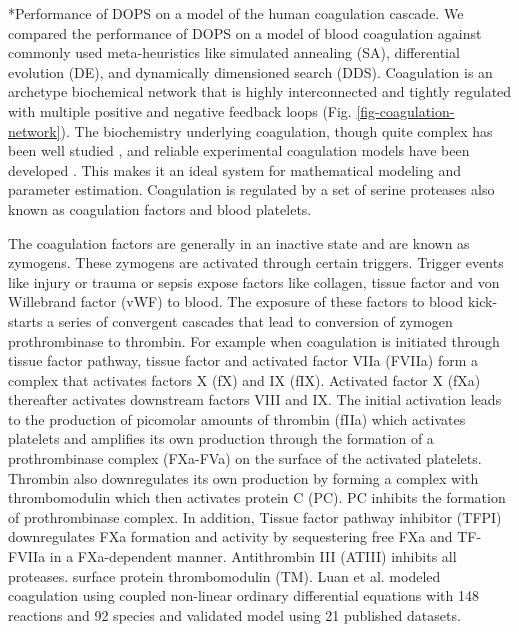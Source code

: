 \documentclass[12pt]{article}
\makeatletter
\renewcommand\subsection{\@startsection
	{subsection}{2}{0mm}
	{-0.05in}
	{-0.5\baselineskip}
	{\normalfont\normalsize\bfseries}}
\makeatother
\begin{document}
\subsection*{Performance of DOPS on a model of the human coagulation cascade.}
We compared the performance of DOPS on a model of blood coagulation against commonly used meta-heuristics like simulated annealing (SA), differential evolution (DE), and dynamically dimensioned search (DDS). Coagulation is an archetype biochemical network that is highly interconnected and tightly regulated with multiple positive and negative feedback loops (Fig. \ref{fig-coagulation-network}). The biochemistry underlying coagulation, though quite complex has been well studied \cite{mann2003dynamics,mann2003all,mann2003thrombin,vogler2009contact,diamond2013systems,fogelson2005coagulation,anand2003model}, and reliable experimental coagulation models have been developed \cite{hockin2002model,chatterjee2010systems,mann2006models,luan2007computationally}. This makes it an ideal system for mathematical modeling and parameter estimation. Coagulation is regulated by a set of serine proteases also known as coagulation factors and blood platelets.  

The coagulation factors are generally in an inactive state and are known as zymogens. These zymogens are activated through certain triggers. Trigger events like injury or trauma or sepsis expose factors like collagen, tissue factor and von Willebrand factor (vWF) to blood. The exposure of these factors to blood kick-starts a series of convergent cascades that lead to conversion of zymogen prothrombinase to thrombin.  For example when coagulation is initiated through tissue factor pathway, tissue factor and activated factor VIIa (FVIIa) form a complex that activates factors X (fX) and IX (fIX). Activated factor X (fXa) thereafter activates downstream factors VIII and IX. The initial activation leads to the production of picomolar amounts of thrombin (fIIa) which activates platelets and amplifies its own production through the formation of a prothrombinase complex (FXa-FVa) on the surface of the activated platelets. Thrombin also  downregulates its own production by forming a complex with thrombomodulin which then activates protein C (PC). PC inhibits the formation of prothrombinase complex. In addition, Tissue factor pathway inhibitor (TFPI) downregulates FXa formation and activity by sequestering free FXa and TF-FVIIa in a FXa-dependent manner. Antithrombin III (ATIII)  inhibits all proteases. surface protein thrombomodulin (TM). Luan et al. modeled coagulation using coupled non-linear ordinary differential equations with 148 reactions and 92 species \cite{luan2007computationally} and validated model using 21 published datasets.
\end{document}
